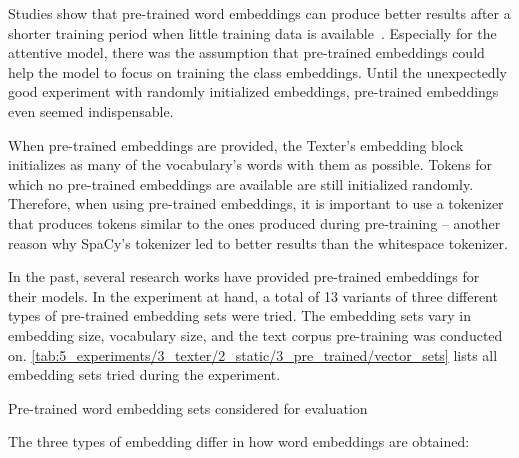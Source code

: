 Studies show that pre-trained word embeddings can produce better results after a shorter training period when little training data is available~\cite{}. Especially for the attentive model, there was the assumption that pre-trained embeddings could help the model to focus on training the class embeddings. Until the unexpectedly good experiment with randomly initialized embeddings, pre-trained embeddings even seemed indispensable.

When pre-trained embeddings are provided, the Texter's embedding block initializes as many of the vocabulary's words with them as possible. Tokens for which no pre-trained embeddings are available are still initialized randomly. Therefore, when using pre-trained embeddings, it is important to use a tokenizer that produces tokens similar to the ones produced during pre-training -- another reason why SpaCy's tokenizer led to better results than the whitespace tokenizer.

In the past, several research works have provided pre-trained embeddings for their models. In the experiment at hand, a total of 13 variants of three different types of pre-trained embedding sets were tried. The embedding sets vary in embedding size, vocabulary size, and the text corpus pre-training was conducted on. \autoref{tab:5_experiments/3_texter/2_static/3_pre_trained/vector_sets} lists all embedding sets tried during the experiment.

\begin{table}[t]
    \centering
    
    \caption{Pre-trained word embedding sets considered for evaluation}
    \label{tab:5_experiments/3_texter/2_static/3_pre_trained/vector_sets}
\end{table}

The three types of embedding differ in how word embeddings are obtained:

